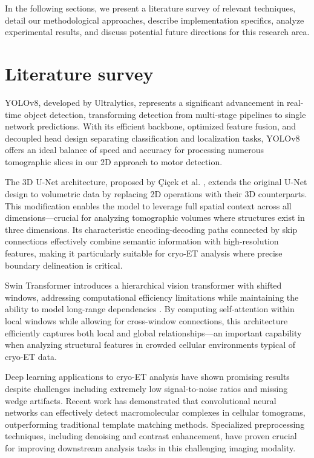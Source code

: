 \documentclass{article}
\begin{document}
In the following sections, we present a literature survey of relevant techniques, detail our methodological approaches, describe implementation specifics, analyze experimental results, and discuss potential future directions for this research area.


\section{Literature survey}
\label{sec:lite}
    YOLOv8, developed by Ultralytics, represents a significant advancement in real-time object detection, transforming detection from multi-stage pipelines to single network predictions\cite{jocherUltralyticsYolov5V702022}. With its efficient backbone, optimized feature fusion, and decoupled head design separating classification and localization tasks, YOLOv8 offers an ideal balance of speed and accuracy for processing numerous tomographic slices in our 2D approach to motor detection\cite{yaseenWhatYOLOv8InDepth2024}.

    The 3D U-Net architecture, proposed by Çiçek et al. \cite{cicek3DUNetLearning2016}, extends the original U-Net design to volumetric data by replacing 2D operations with their 3D counterparts. This modification enables the model to leverage full spatial context across all dimensions—crucial for analyzing tomographic volumes where structures exist in three dimensions. Its characteristic encoding-decoding paths connected by skip connections effectively combine semantic information with high-resolution features, making it particularly suitable for cryo-ET analysis where precise boundary delineation is critical.

    Swin Transformer introduces a hierarchical vision transformer with shifted windows, addressing computational efficiency limitations while maintaining the ability to model long-range dependencies \cite{liuSwinTransformerHierarchical2021}. By computing self-attention within local windows while allowing for cross-window connections, this architecture efficiently captures both local and global relationships—an important capability when analyzing structural features in crowded cellular environments typical of cryo-ET data.

    Deep learning applications to cryo-ET analysis have shown promising results despite challenges including extremely low signal-to-noise ratios and missing wedge artifacts. Recent work has demonstrated that convolutional neural networks can effectively detect macromolecular complexes in cellular tomograms, outperforming traditional template matching methods\cite{chenConvolutionalNeuralNetworks2017}. Specialized preprocessing techniques, including denoising and contrast enhancement, have proven crucial for improving downstream analysis tasks in this challenging imaging modality.
\end{document}
